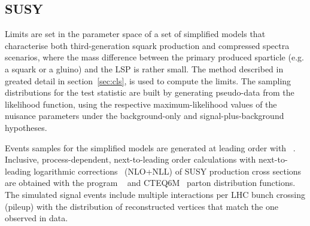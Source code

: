 \clearpage
\subsection{SUSY\label{sec:interpretation}}

Limits are set in the parameter space of a set of simplified models
that characterise both third-generation squark production and
compressed spectra scenarios, where the mass difference between the
primary produced sparticle (e.g. a squark or a gluino) and the LSP is
rather small. The \cls method described in greated detail in 
section~\ref{sec:cls}, is used to compute the limits. The sampling 
distributions for the test statistic are built by generating 
pseudo-data from the likelihood
function, using the respective maximum-likelihood values of the
nuisance parameters under the background-only and
signal-plus-background hypotheses.
 
Events samples for the simplified models are generated at leading
order with \MADGRAPH~\cite{madgraph}. Inclusive, process-dependent,
next-to-leading order calculations with next-to-leading logarithmic
corrections~\cite{susy-nlo-nll} (NLO+NLL) of SUSY production cross
sections are obtained with the program
\PROSPINO~\cite{Beenakker:1996ch} and CTEQ6M~\cite{Pumplin:2002vw}
parton distribution functions. The simulated signal events include
multiple interactions per LHC bunch crossing (pileup) with the
distribution of reconstructed vertices that match the one observed in
data.

